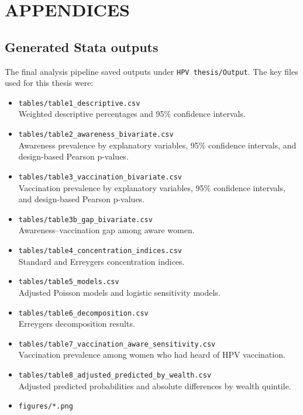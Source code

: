 \appendix
\chapter{APPENDICES}

\section{Generated Stata outputs}

The final analysis pipeline saved outputs under \texttt{HPV thesis/Output}. The key files used for this thesis were:

\begin{itemize}
    \item \texttt{tables/table1\_descriptive.csv}\\
    Weighted descriptive percentages and 95\% confidence intervals.
    \item \texttt{tables/table2\_awareness\_bivariate.csv}\\
    Awareness prevalence by explanatory variables, 95\% confidence intervals, and design-based Pearson p-values.
    \item \texttt{tables/table3\_vaccination\_bivariate.csv}\\
    Vaccination prevalence by explanatory variables, 95\% confidence intervals, and design-based Pearson p-values.
    \item \texttt{tables/table3b\_gap\_bivariate.csv}\\
    Awareness--vaccination gap among aware women.
    \item \texttt{tables/table4\_concentration\_indices.csv}\\
    Standard and Erreygers concentration indices.
    \item \texttt{tables/table5\_models.csv}\\
    Adjusted Poisson models and logistic sensitivity models.
    \item \texttt{tables/table6\_decomposition.csv}\\
    Erreygers decomposition results.
    \item \texttt{tables/table7\_vaccination\_aware\_sensitivity.csv}\\
    Vaccination prevalence among women who had heard of HPV vaccination.
    \item \texttt{tables/table8\_adjusted\_predicted\_by\_wealth.csv}\\
    Adjusted predicted probabilities and absolute differences by wealth quintile.
    \item \texttt{figures/*.png}\\

\end{itemize}
